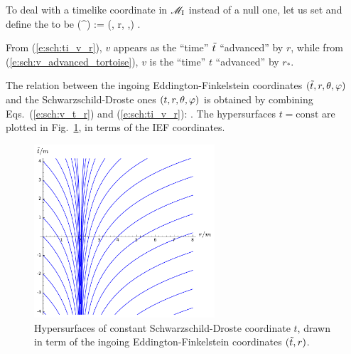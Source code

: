 To deal with a timelike coordinate in $\mathscr{M}_{\rm I}$ instead of a null one, let us set
\be  \label{e:sch:ti_v_r}
     \iff {}
\ee
and define the 
to be
\be
    (^\alpha) := (\ti, r, \th,\ph) .
\ee

\begin{remark}
From (\ref{e:sch:ti_v_r}), $v$ appears as the ``time'' ${\tilde t}$ ``advanced'' by
$r$, while
from (\ref{e:sch:v_advanced_tortoise}), $v$ is the ``time'' $t$ ``advanced''
by $r_*$.
\end{remark}

The relation between the ingoing Eddington-Finkelstein coordinates
$({\tilde t}, r, \theta,\varphi)$
and the Schwarzschild-Droste ones $(t,r,\theta,\varphi)$ is obtained by combining
Eqs.~(\ref{e:sch:v_t_r}) and (\ref{e:sch:ti_v_r}):
\be \label{e:sch:ti_t_r}
      .
\ee
The hypersurfaces $t=\mathrm{const}$ are plotted in Fig.~\ref{f:sch:SD_slices},
in terms of the IEF coordinates.

\begin{figure}
\centerline{\includegraphics[width=0.6\textwidth]{sch_SD_slices.pdf}}
\caption[]{\label{f:sch:SD_slices} \footnotesize
Hypersurfaces of constant Schwarzschild-Droste coordinate $t$, drawn in term
of the ingoing Eddington-Finkelstein coordinates $({\tilde t},r)$.}
\end{figure}

